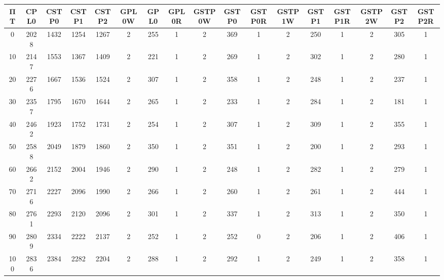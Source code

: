 \begin{tabular}{|c|c|c|c|c|c|c|c|c|c|c|c|c|c|c|c|c|}
\hline
ΠΤ&CPL0&CSTP0&CSTP1&CSTP2&GPL0W&GPL0&GPL0R&GSTP0W&GSTP0&GSTP0R&GSTP1W&GSTP1&GSTP1R&GSTP2W&GSTP2&GSTP2R\\\hline
\hline
0&2028&1432&1254&1267&2&255&1&2&369&1&2&250&1&2&305&1\\
\hline
10&2147&1553&1367&1409&2&221&1&2&269&1&2&302&1&2&280&1\\
\hline
20&2276&1667&1536&1524&2&307&1&2&358&1&2&248&1&2&237&1\\
\hline
30&2357&1795&1670&1644&2&265&1&2&233&1&2&284&1&2&181&1\\
\hline
40&2462&1923&1752&1731&2&254&1&2&307&1&2&309&1&2&355&1\\
\hline
50&2588&2049&1879&1860&2&350&1&2&351&1&2&200&1&2&293&1\\
\hline
60&2662&2152&2004&1946&2&290&1&2&248&1&2&282&1&2&279&1\\
\hline
70&2716&2227&2096&1990&2&266&1&2&260&1&2&261&1&2&444&1\\
\hline
80&2761&2293&2120&2096&2&301&1&2&337&1&2&313&1&2&350&1\\
\hline
90&2809&2334&2222&2137&2&252&1&2&252&0&2&206&1&2&406&1\\
\hline
100&2836&2384&2282&2204&2&288&1&2&292&1&2&249&1&2&358&1\\
\hline
\end{tabular}

